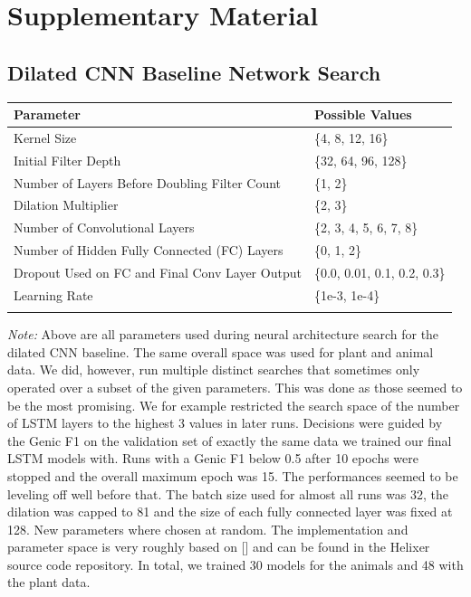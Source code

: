 \documentclass{bioinfo}
\begin{document}



\newpage

\section{Supplementary Material}

\subsection{Dilated CNN Baseline Network Search}
\label{sec:dcnn}
\begin{table}[!t]
 {
\begin{tabular}{@{}ll@{}}
\toprule Parameter & Possible Values \\
\midrule
Kernel Size & \{4, 8, 12, 16\}\\
Initial Filter Depth & \{32, 64, 96, 128\}\\
Number of Layers Before Doubling Filter Count & \{1, 2\}\\
Dilation Multiplier & \{2, 3\}\\
Number of Convolutional Layers & \{2, 3, 4, 5, 6, 7, 8\}\\
Number of Hidden Fully Connected (FC) Layers & \{0, 1, 2\}\\	
Dropout Used on FC and Final Conv Layer Output & \{0.0, 0.01, 0.1, 0.2, 0.3\}\\
Learning Rate & \{1e-3, 1e-4\}\\

\botrule
\end{tabular}}{{\it Note:} Above are all parameters used during neural architecture search for the dilated CNN baseline. The same overall space was used for plant and animal data. We did, however, run multiple distinct searches that sometimes only operated over a subset of the given parameters. This was done as those seemed to be the most promising. We for example restricted the search space of the number of LSTM layers to the highest 3 values in later runs. Decisions were guided by the Genic F1 on the validation set of exactly the same data we trained our final LSTM models with. Runs with a Genic F1 below 0.5 after 10 epochs were stopped and the overall maximum epoch was 15. The performances seemed to be leveling off well before that. The batch size used for almost all runs was 32, the dilation was capped to 81 and the size of each fully connected layer was fixed at 128. New parameters where chosen at random. The implementation and parameter space is very roughly based on [\citealp{dCNNGupta}] and can be found in the Helixer source code repository. In total, we trained 30 models for the animals and 48 with the plant data.}
\end{table}
\end{document}
